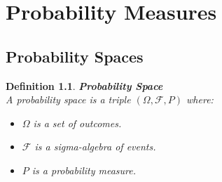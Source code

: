 \documentclass[11pt]{book}
\newtheorem{definition}{Definition}[section]
\begin{document}
\chapter{Probability Measures}

\section{Probability Spaces}

\begin{definition}{\textbf{Probability Space}} \\
    A probability space is a triple \( (\Omega, \mathcal{F}, P) \) where:
    \begin{itemize}
        \item \( \Omega \) is a set of outcomes.
        \item \( \mathcal{F} \) is a sigma-algebra of events.
        \item \( P \) is a probability measure.
    \end{itemize}
\end{definition}
\end{document}
